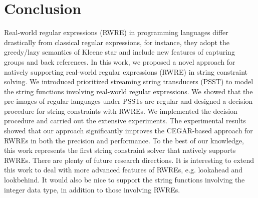 
\section{Conclusion}

Real-world regular expressions (RWRE) in programming languages differ drastically from classical regular expressions, for instance, they adopt the greedy/lazy semantics of Kleene star and include new features of capturing groups and back references. In this work, we proposed a novel approach for natively supporting real-world regular expressions (RWRE) in string constraint solving. We introduced prioritized streaming string transducers (PSST) to  model the string functions involving real-world regular expressions. We showed that the pre-images of regular languages under PSSTs are regular and designed a decision procedure for string constraints with RWREs. We implemented the decision procedure and carried out the extensive experiments. The experimental results showed that our approach significantly improves the CEGAR-based approach for RWREs in both the precision and performance. To the best of our knowledge, this work represents the first string constraint solver that natively supports RWREs. There are plenty of future research directions. It is interesting to extend this work to deal with more advanced features of RWREs, e.g. lookahead and lookbehind. It would also be nice to support the string functions involving the integer data type, in addition to those involving RWREs.
